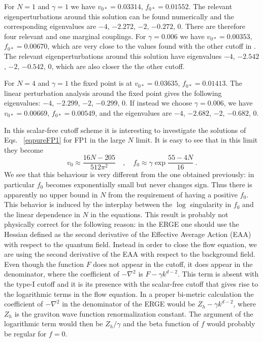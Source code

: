 \documentclass[a4paper,11pt]{revtex4}
\newcommand{\be}{\begin{equation}}
\newcommand{\ee}{\end{equation}}
\begin{document}
For $N=1$ and $\gamma=1$ we have $v_{0*}=0.03314$, $f_{0*}=0.01552$.
The relevant eigenperturbations around this solution 
can be found numerically and the corresponding eigenvalues are
$-4$, $-2.272$, $-2$, $-0.272$, $0$.
There are therefore four relevant and one marginal couplings.
For $\gamma=0.006$ we have $v_{0*}=0.00353$, $f_{0*}=0.00670$,
which are very close to the values found with the other cutoff in \cite{pv1}.
The relevant eigenperturbations around this solution 
have eigenvalues $-4$, $-2.542$, $-2$, $-0.542$, $0$,
which are also closer the the other cutoff.

For $N=4$ and $\gamma=1$ the fixed point is at $v_{0*}=0.03635$, $f_{0*}=0.01413$.
The linear perturbation analysis around the fixed point gives the following eigenvalues: $-4$, $-2.299$, $-2$, $-0.299$, $0$.
If instead we choose $\gamma=0.006$, we have $v_{0*}=0.00669$, $f_{0*}=0.00549$,
and the eigenvalues are $-4$, $-2.682$, $-2$, $-0.682$, $0$.

In this scalar-free cutoff scheme it is interesting to investigate the solutions of Eqs. ~\eqref{eqpureFP1} for FP1 in the large $N$ limit.
It is easy to see that in this limit they become
\be
v_0\approx \frac{16N-205}{512\pi^2} \quad , \quad 
f_0\approx \gamma\exp{\frac{55-4N}{16}}\ .
\ee
We see that this behaviour is very different from the one obtained previously: in particular $f_0$ becomes exponentially small
but never changes sign.
Thus there is apparently no upper bound in $N$ from the requirement of having a positive $f_0$. This behavior is induced by the interplay between the $\log$ singularity in $f_0$ and the linear dependence in $N$ in the equations.
This result is probably not physically correct for the following 
reason: in the ERGE one should use the Hessian defined as the second derivative of the Effective Average Action (EAA) with respect to the quantum field.
Instead in order to close the flow equation, 
we are using the second derivative of the
EAA with respect to the background field.
Even though the function $F$ does not appear in the cutoff,
it does appear in the denominator, where the coefficient
of $-\nabla^2$ is $F-\gamma k^{d-2}$.
This term is absent with the type-I cutoff and
it is its presence with the scalar-free cutoff that gives rise
to the logarithmic terms in the flow equation.
In a proper bi-metric calculation the coefficient of 
$-\nabla^2$ in the denominator of the ERGE
would be $Z_h-\gamma k^{d-2}$, where $Z_h$ is the graviton
wave function renormalization constant.
The argument of the logarithmic term would then be $Z_h/\gamma$
and the beta function of $f$ would probably be regular for $f=0$.
\end{document}

